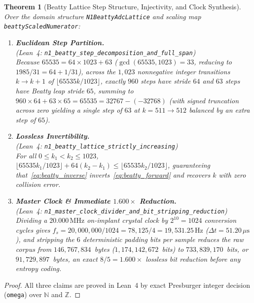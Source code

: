 \documentclass[11pt,letterpaper]{article}
\newcommand{\lean}[1]{\nolinkurl{#1}}
\newtheorem{theorem}{Theorem}[section]
\theoremstyle{definition}
\newcommand{\N}{\mathbb{N}}
\newcommand{\Z}{\mathbb{Z}}
\begin{document}
\begin{theorem}[Beatty Lattice Step Structure, Injectivity, and Clock Synthesis]\label{thm:pillar1}
Over the domain structure \lean{N1BeattyAdcLattice} and scaling map \lean{beattyScaledNumerator}:
\begin{enumerate}
  \item \textbf{Euclidean Step Partition.}\\
  (\emph{Lean~4:} \lean{n1_beatty_step_decomposition_and_full_span})\\
  Because $65535 = 64 \times 1023 + 63$ ($\gcd(65535, 1023) = 33$, reducing to $1985 / 31 = 64 + 1/31$), across the $1{,}023$ nonnegative integer transitions $k \to k + 1$ of $\lfloor 65535k/1023 \rfloor$, exactly $960$ steps have stride $64$ and $63$ steps have Beatty leap stride $65$, summing to $960 \times 64 + 63 \times 65 = 65535 = 32767 - (-32768)$ (with signed truncation across zero yielding a single step of $63$ at $k = 511 \to 512$ balanced by an extra step of $65$).
  \item \textbf{Lossless Invertibility.}\\
  (\emph{Lean~4:} \lean{n1_beatty_lattice_strictly_increasing})\\
  For all $0 \le k_1 < k_2 \le 1023$, $\lfloor 65535 k_1 / 1023 \rfloor + 64(k_2 - k_1) \le \lfloor 65535 k_2 / 1023 \rfloor$, guaranteeing that~\eqref{eq:beatty_inverse} inverts~\eqref{eq:beatty_forward} and recovers $k$ with zero collision error.
  \item \textbf{Master Clock \& Immediate $1.600\times$ Reduction.}\\
  (\emph{Lean~4:} \lean{n1_master_clock_divider_and_bit_stripping_reduction})\\
  Dividing a $20.000\,\text{MHz}$ on-implant crystal clock by $2^{10} = 1024$ conversion cycles gives $f_s = 20{,}000{,}000 / 1024 = 78{,}125 / 4 = 19{,}531.25\,\text{Hz}$ ($\Delta t = 51.20\,\mu\text{s}$), and stripping the $6$ deterministic padding bits per sample reduces the raw corpus from $146{,}767{,}834$~bytes ($1{,}174{,}142{,}672$~bits) to $733{,}839{,}170$~bits, or $91{,}729{,}897$~bytes, an exact $8/5 = 1.600\times$ lossless bit reduction before any entropy coding.
\end{enumerate}
\end{theorem}
\begin{proof}
All three claims are proved in Lean~4 by exact Presburger integer decision (\texttt{omega}) over $\N$ and $\Z$.
\end{proof}
\end{document}
